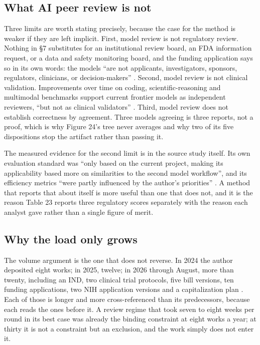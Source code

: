 \subsection{What AI peer review is not}

Three limits are worth stating precisely, because the case for the method is
weaker if they are left implicit. First, model review is not regulatory review.
Nothing in \S7 substitutes for an institutional review board, an FDA
information request, or a data and safety monitoring board, and the funding
application says so in its own words: the models ``are not applicants,
investigators, sponsors, regulators, clinicians, or decision-makers''
\cite{rfarm27001v2}. Second, model review is not clinical validation.
Improvements over time on coding, scientific-reasoning and multimodal benchmarks
support current frontier models as independent reviewers, ``but not as clinical
validators'' \cite{rfarm27001v2, aiprgliomatc}. Third, model review does not
establish correctness by agreement. Three models agreeing is three reports, not
a proof, which is why Figure 24's tree never averages and why two of its five
dispositions stop the artifact rather than passing it.

The measured evidence for the second limit is in the source study itself. Its
own evaluation standard was ``only based on the current project, making its
applicability based more on similarities to the second model workflow'', and its
efficiency metrics ``were partly influenced by the author's priorities''
\cite{aiprgliomatc}. A method that reports that about itself is more useful than
one that does not, and it is the reason Table 23 reports three regulatory scores
separately with the reason each analyst gave rather than a single figure of
merit.

\subsection{Why the load only grows}

The volume argument is the one that does not reverse. In 2024 the author
deposited eight works; in 2025, twelve; in 2026 through August, more than
twenty, including an IND, two clinical trial protocols, five bill versions, ten
funding applications, two NIH application versions and a capitalization plan
\cite{repo2026}. Each of those is longer and more cross-referenced than its
predecessors, because each reads the ones before it. A review regime that took
seven to eight weeks per round in its best case was already the binding
constraint at eight works a year; at thirty it is not a constraint but an
exclusion, and the work simply does not enter it.

